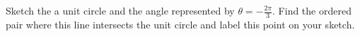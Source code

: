 {Sketch the a unit circle and the angle represented by $\theta = -\frac{2\pi}{3}$. Find the ordered pair where this line intersects the unit circle and label this point on your sketch.}
{\text{}\\ \label{fig:03_04_ex_17}\\
}
